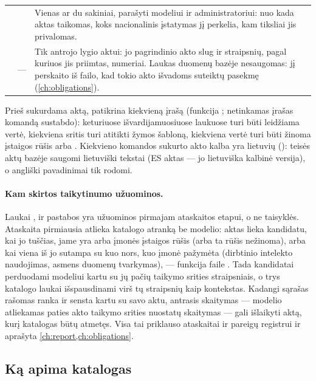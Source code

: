 \begin{table}[H]
\begin{tabularx}{\textwidth}{@{}L{27mm}L{31mm}Y@{}}
 &  & Vienas ar du sakiniai, parašyti modeliui ir administratoriui: nuo kada aktas taikomas, koks nacionalinis įstatymas jį perkelia, kam tiksliai jis privalomas. \\
 & --- & Tik antrojo lygio aktui: jo pagrindinio akto slug ir straipsnių, pagal kuriuos jis priimtas, numeriai. Laukas duomenų bazėje nesaugomas:  jį perskaito iš failo, kad tokio akto išvadoms suteiktų pasekmę (\cref{ch:obligations}). \\
\bottomrule
\end{tabularx}
\end{table}

Prieš sukurdama aktą,  patikrina kiekvieną įrašą (funkcija
; netinkamas įrašas komandą sustabdo): keturiuose išvardijamuosiuose laukuose
turi būti leidžiama vertė, kiekviena sritis turi atitikti žymos šabloną, kiekviena
 vertė turi būti žinoma įstaigos rūšis arba . Kiekvieno komandos sukurto akto
kalba yra lietuvių (): teisės aktų bazėje saugomi lietuviški tekstai (ES
aktas --- jo lietuviška kalbinė versija), o angliški pavadinimai tik rodomi.

\paragraph{Kam skirtos taikytinumo užuominos.} Laukai ,  ir
pastabos yra užuominos pirmajam ataskaitos etapui, o ne taisyklės. Ataskaita pirmiausia atlieka
katalogo atranką be modelio: aktas lieka kandidatu, kai jo  tuščias, jame yra
 arba įmonės įstaigos rūšis (arba ta rūšis nežinoma), arba kai viena iš jo
 sutampa su kuo nors, kuo įmonė pažymėta (dirbtinio intelekto naudojimas, asmens
duomenų tvarkymas), --- funkcija  faile .
Tada kandidatai perduodami modeliui kartu su jų pačių taikymo srities straipsniais, o trys
katalogo laukai išspausdinami virš tų straipsnių kaip kontekstas. Kadangi sąrašas rašomas ranka
ir sensta kartu su savo aktu, antrasis skaitymas --- modelio atliekamas paties akto taikymo
srities nuostatų skaitymas --- gali išlaikyti aktą, kurį katalogas būtų atmetęs. Visa tai
priklauso ataskaitai ir pareigų registrui ir aprašyta \cref{ch:report,ch:obligations}.

\subsection{Ką apima katalogas}\label{sec:corpus:counts}


